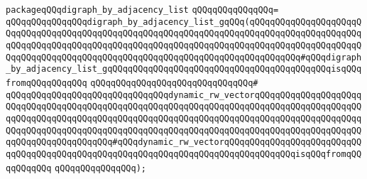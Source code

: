 \verb|packageqQQqdigraph_by_adjacency_list|\newline
\verb|qQQqqQQqqQQqqQQq=|\newline
\verb|qQQqqQQqqQQqqQQqdigraph_by_adjacency_list_gqQQq(qQQqqQQqqQQqqQQqqQQqqQQqqQQqqQQqqQQqqQQqqQQqqQQqqQQqqQQqqQQqqQQqqQQqqQQqqQQqqQQqqQQqqQQqqQQqqQQqqQQqqQQqqQQqqQQqqQQqqQQqqQQqqQQqqQQqqQQqqQQqqQQqqQQqqQQqqQQqqQQqqQQqqQQqqQQqqQQqqQQqqQQqqQQqqQQqqQQqqQQqqQQqqQQqqQQqqQQqqQQq#qQQqdigraph_by_adjacency_list_gqQQqqQQqqQQqqQQqqQQqqQQqqQQqqQQqqQQqqQQqqQQqisqQQqfromqQQqqQQqqQQq|\newline
\verb|qQQqqQQqqQQqqQQqqQQqqQQqqQQqqQQq#|\newline
\verb|qQQqqQQqqQQqqQQqqQQqqQQqqQQqqQQqdynamic_rw_vectorqQQqqQQqqQQqqQQqqQQqqQQqqQQqqQQqqQQqqQQqqQQqqQQqqQQqqQQqqQQqqQQqqQQqqQQqqQQqqQQqqQQqqQQqqQQqqQQqqQQqqQQqqQQqqQQqqQQqqQQqqQQqqQQqqQQqqQQqqQQqqQQqqQQqqQQqqQQqqQQqqQQqqQQqqQQqqQQqqQQqqQQqqQQqqQQqqQQqqQQqqQQqqQQqqQQqqQQqqQQqqQQqqQQqqQQqqQQqqQQqqQQqqQQqqQQq#qQQqdynamic_rw_vectorqQQqqQQqqQQqqQQqqQQqqQQqqQQqqQQqqQQqqQQqqQQqqQQqqQQqqQQqqQQqqQQqqQQqqQQqqQQqqQQqqQQqisqQQqfromqQQqqQQqqQQq|\newline
\verb|qQQqqQQqqQQqqQQq);|\newline

